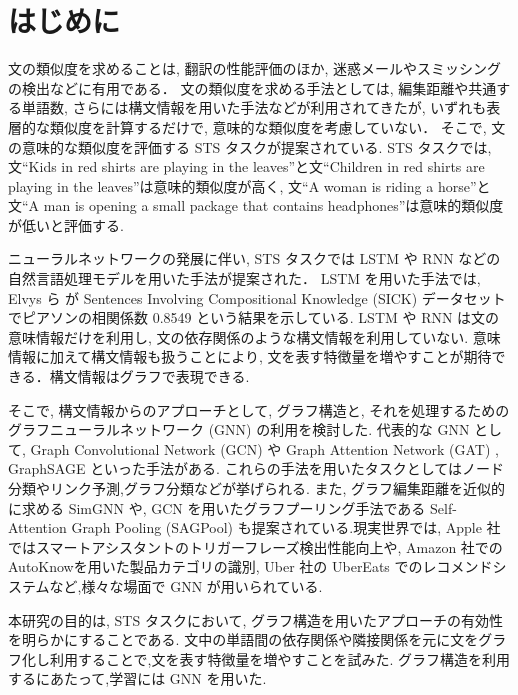 \documentclass[a4j,12pt]{thesis} %
\begin{document}
\newcommand{\ctext}[1]{\raise0.2ex\hbox{\textcircled{\scriptsize{#1}}}}
\setlength{\baselineskip}{1.95zw}
\setlength{\textheight}{30\baselineskip}
\mainmatter

\fi
\renewcommand\thefootnote{\arabic{footnote}}



\chapter{はじめに}\label{intro}
文の類似度を求めることは, 翻訳の性能評価のほか, 迷惑メールやスミッシングの検出などに有用である．
文の類似度を求める手法としては, 編集距離や共通する単語数, さらには構文情報を用いた手法などが利用されてきたが, いずれも表層的な類似度を計算するだけで, 意味的な類似度を考慮していない．
そこで, 文の意味的な類似度を評価する STS タスクが提案されている.
STS タスクでは, 文``Kids in red shirts are playing in the leaves''と文``Children in red shirts are playing in the leaves''は意味的類似度が高く, 文``A woman is riding a horse''と文``A man is opening a small package that contains headphones''は意味的類似度が低いと評価する.
\par ニューラルネットワークの発展に伴い, STS タスクでは LSTM や RNN などの自然言語処理モデルを用いた手法が提案された．
LSTM を用いた手法では, Elvys ら \cite{elvys2018predicting} が Sentences Involving Compositional Knowledge (SICK) \cite{beltagy:arxiv15} データセットでピアソンの相関係数 0.8549 という結果を示している.
LSTM や RNN は文の意味情報だけを利用し, 文の依存関係のような構文情報を利用していない.
意味情報に加えて構文情報も扱うことにより, 文を表す特徴量を増やすことが期待できる．構文情報はグラフで表現できる.
\par そこで, 構文情報からのアプローチとして, グラフ構造と, それを処理するためのグラフニューラルネットワーク (GNN) の利用を検討した.
代表的な GNN として, Graph Convolutional Network (GCN) \cite{kipf2017semi} や Graph Attention Network (GAT) \cite{velickovic2018graph}, GraphSAGE \cite{hamilton2017inductive} といった手法がある. これらの手法を用いたタスクとしてはノード分類やリンク予測,グラフ分類などが挙げられる. また, グラフ編集距離を近似的に求める SimGNN や, GCN を用いたグラフプーリング手法である Self-Attention Graph Pooling (SAGPool) も提案されている.現実世界では,
Apple 社ではスマートアシスタントのトリガーフレーズ検出性能向上\cite{pranay2020lattice}や, Amazon 社での AutoKnow\cite{xin2020autoknow}を用いた製品カテゴリの識別, Uber 社の UberEats でのレコメンドシステム\cite{jain2019food}\cite{bose2019meta}など,様々な場面で GNN が用いられている.
\par 本研究の目的は, STS タスクにおいて, グラフ構造を用いたアプローチの有効性を明らかにすることである.
文中の単語間の依存関係や隣接関係を元に文をグラフ化し利用することで,文を表す特徴量を増やすことを試みた.
グラフ構造を利用するにあたって,学習には GNN を用いた.
\end{document}
